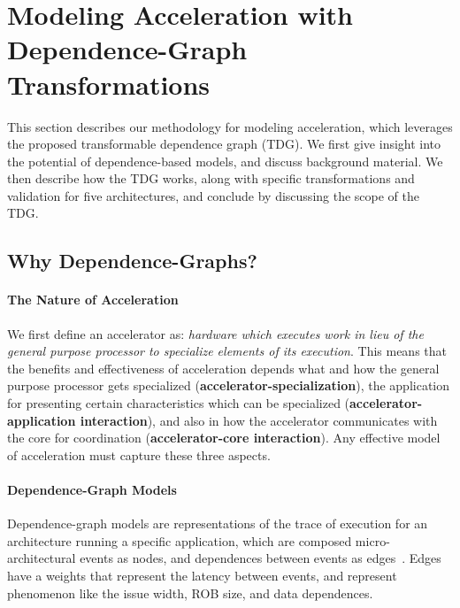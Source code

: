 \section{Modeling Acceleration with Dependence-Graph Transformations} \label{sec:tdg}

This section describes our methodology for modeling acceleration, which
leverages the proposed transformable dependence graph (TDG).
We first give insight into the potential of dependence-based models, and discuss
background material.  We then describe how the TDG works, 
along with specific transformations and validation for five architectures, and conclude
by discussing the scope of the TDG.

\subsection{Why Dependence-Graphs?}
\paragraph{The Nature of Acceleration}
We first define an accelerator as: \emph{hardware which executes 
work in lieu of the general purpose processor to specialize elements 
of its execution}.  This means that the benefits and effectiveness of acceleration
depends what and how the general purpose processor gets specialized 
(\textbf{accelerator-specialization}),
the application for presenting certain characteristics which can be
specialized (\textbf{accelerator-application interaction}), 
and also in how the accelerator communicates with the 
core for coordination (\textbf{accelerator-core interaction}).  
Any effective model of acceleration must capture these three aspects.


\paragraph{Dependence-Graph Models} 
Dependence-graph models are representations of the trace of execution for an architecture
running a specific application, which are composed micro-architectural events
as nodes, and dependences between events as edges~\cite{fields:isca01}.  Edges
have a weights that represent the latency between events, and represent phenomenon
like the issue width, ROB size, and data dependences.

